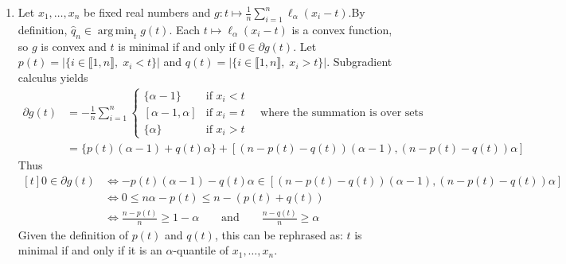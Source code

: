 \documentclass[a4paper,11pt]{article}
\DeclareMathOperator*{\argmin}{arg\,min}
\begin{document}
\begin{enumerate}
  \item Let $x_1,\ldots,x_n$ be fixed real numbers and $g:t \mapsto \frac 1n \sum_{i=1}^n \ell_\alpha(x_i-t)$.\newline By definition, $\hat q_n\in \argmin_{t} g(t)$. Each $t\mapsto \ell_\alpha(x_i-t)$ is a convex function, so $g$ is convex and $t$ is minimal if and only if $0\in \partial g(t)$.\newline
  Let $p(t) = |\{i\in \llbracket 1,n\rrbracket, \; x_i<t\}|$ and $q(t) = |\{i\in \llbracket 1,n\rrbracket, \; x_i>t\}|$. Subgradient calculus yields 
  $$
  \begin{aligned}
  \partial g(t) &= -\frac 1n \sum_{i=1}^n 
  \begin{cases} 
  \{\alpha-1\} &\text{if } x_i<t \\
  [\alpha-1,\alpha] &\text{if } x_i=t\\
  \{\alpha\} &\text{if } x_i>t
  \end{cases} \quad \text{where the summation is over sets}\\
  &= \{p(t)(\alpha-1) + q(t)\alpha\} + [(n-p(t)-q(t))(\alpha-1),(n-p(t)-q(t))\alpha]
  \end{aligned}$$
  Thus $\begin{aligned}[t]0\in \partial g(t)&\iff -p(t)(\alpha-1) - q(t)\alpha \in [(n-p(t)-q(t))(\alpha-1),(n-p(t)-q(t))\alpha] \\
  &\iff 0\leq n\alpha - p(t) \leq n-(p(t)+q(t)) \\
  &\iff \frac{n-p(t)}{n} \geq 1-\alpha \qquad \text{and} \qquad \frac{n-q(t)}{n} \geq \alpha
  \end{aligned}$\\
  Given the definition of $p(t)$ and $q(t)$, this can be rephrased as: $t$ is minimal if and only if it is an $\alpha$-quantile of $x_1,\ldots,x_n$.


\end{enumerate}
\end{document}
